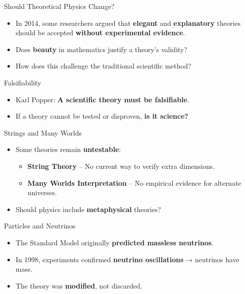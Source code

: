 \begin{frame}{Should Theoretical Physics Change?}
	\begin{itemize}
		\item In 2014, some researchers argued that \textbf{elegant} and
			\textbf{explanatory} theories should be accepted
			\textbf{without experimental evidence}. \cite{Ellis2014}
		\item Does \textbf{beauty} in mathematics justify a theory’s validity?
		\item How does this challenge the traditional scientific method?
	\end{itemize}
\end{frame}

\begin{frame}{Falsifiability}
	\begin{itemize}
		\item Karl Popper: \textbf{A scientific theory must be falsifiable}.
			\cite{Popper2005}
		\item If a theory cannot be tested or disproven, \textbf{is it science?}
	\end{itemize}
\end{frame}

\begin{frame}{Strings and Many Worlds}
	\begin{itemize}
		\item Some theories remain \textbf{untestable}:
			\begin{itemize}
				\item \textbf{String Theory} – No current way to verify extra dimensions.
				\item \textbf{Many Worlds Interpretation} – No empirical evidence for alternate universes.
			\end{itemize}
		\item Should physics include \textbf{metaphysical} theories? \cite{Ellis2014}
	\end{itemize}
\end{frame}

\begin{frame}{Particles and Neutrinos}
	\begin{itemize}
		\item The Standard Model originally \textbf{predicted massless neutrinos}.
		\item In 1998, experiments confirmed \textbf{neutrino oscillations} → neutrinos have mass.
		\item The theory was \textbf{modified}, not discarded. \cite{Steigman2010}
	\end{itemize}
\end{frame}
